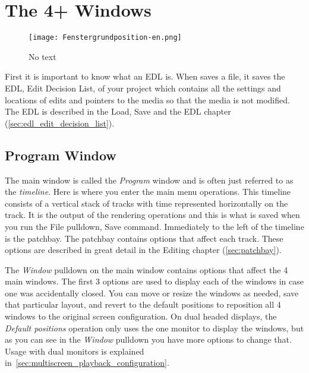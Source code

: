 \chapter{The 4+ Windows}%
\label{cha:the_4_windows}

\begin{figure}[htpb]
    \centering
    \texttt{[image: Fenstergrundposition-en.png]}
    \captionsetup{labelformat=empty, textformat=empty}
    \caption[The four windows (cc-by-sa Olaf)]{No text}    
    \label{fig:Fenstergrundposition-en}
\end{figure}

First it is important to know what an EDL is. When \CGG{} saves a file, it saves the EDL,
Edit Decision List, of your project which contains all the settings and locations of edits
and pointers to the media so that the media is not modified. The EDL is described in the
Load, Save and the EDL chapter (\ref{sec:edl_edit_decision_list}).

\section{Program Window}%
\label{sec:program_window}

The main window is called the \textit{Program} window and is often just referred to as the \textit{timeline}.  Here is where you enter the main menu operations.  
This timeline consists of a vertical stack of tracks with time represented horizontally on the track. 
It is the output of the rendering operations and this is what is saved when you run the File pulldown, Save command.
Immediately to the left of the timeline is the patchbay. The patchbay contains options that affect each track.  
These options are described in great detail in the Editing chapter (\ref{sec:patchbay}).

The \textit{Window} pulldown on the main window contains options
that affect the 4 main windows. The first 3 options are used to
display each of the windows in case one was accidentally closed.
You can move or resize the windows as needed, save that particular
layout, and revert to the default positions to reposition all 4
windows to the original screen configuration.  On dual headed
displays, the \textit{Default positions} operation only uses the one
monitor to display the windows, but as you can see in the
\textit{Window} pulldown you have more options to change that. Usage
with dual monitors is explained
in~\ref{sec:multiscreen_playback_configuration}.

